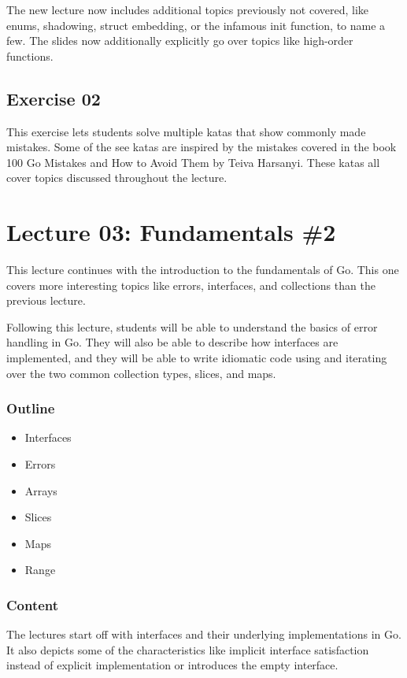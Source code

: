 \documentclass[
  digital,
  color,
  oneside,
  nosansbold,
  nocolorbold,
  nolof,
  nolot,
]{fithesis4}
\begin{document}
The new lecture now includes additional topics previously not covered, like enums, shadowing, struct embedding, or the infamous init function, to name a few. The slides now additionally explicitly go over topics like high-order functions.

\subsection{Exercise 02}

This exercise lets students solve multiple katas that show commonly made mistakes. Some of the see katas are inspired by the mistakes covered in the book 100 Go Mistakes and How to Avoid Them by Teiva Harsanyi\cite{100-go-mistakes}. These katas all cover topics discussed throughout the lecture.

\section{Lecture 03: Fundamentals \#2}

This lecture continues with the introduction to the fundamentals of Go. This one covers more interesting topics like errors, interfaces, and collections than the previous lecture.

Following this lecture, students will be able to understand the basics of error handling in Go. They will also be able to describe how interfaces are implemented, and they will be able to write idiomatic code using and iterating over the two common collection types, slices, and maps.

\subsubsection{Outline}

\begin{itemize}
    \item Interfaces
    \item Errors
    \item Arrays
    \item Slices
    \item Maps
    \item Range
\end{itemize}

\subsubsection{Content}

The lectures start off with interfaces and their underlying implementations in Go. It also depicts some of the characteristics like implicit interface satisfaction instead of explicit implementation or introduces the empty interface.
\end{document}
